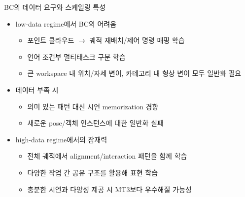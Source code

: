 \documentclass[aspectratio=169]{beamer}
\begin{document}
\begin{frame}{BC의 데이터 요구와 스케일링 특성}
  \small
  \begin{itemize}
    \item low-data regime에서 BC의 어려움
    \begin{itemize}
      \item 포인트 클라우드 $\rightarrow$ 궤적 재배치/제어 명령 매핑 학습
      \item 언어 조건부 멀티태스크 구분 학습
      \item 큰 workspace 내 위치/자세 변이, 카테고리 내 형상 변이 모두 일반화 필요
    \end{itemize}
    \item 데이터 부족 시
    \begin{itemize}
      \item 의미 있는 패턴 대신 시연 memorization 경향
      \item 새로운 pose/객체 인스턴스에 대한 일반화 실패
    \end{itemize}
    \item high-data regime에서의 잠재력
    \begin{itemize}
      \item 전체 궤적에서 alignment/interaction 패턴을 함께 학습
      \item 다양한 작업 간 공유 구조를 활용해 표현 학습
      \item 충분한 시연과 다양성 제공 시 MT3보다 우수해질 가능성
    \end{itemize}
  \end{itemize}
\end{frame}
\end{document}
